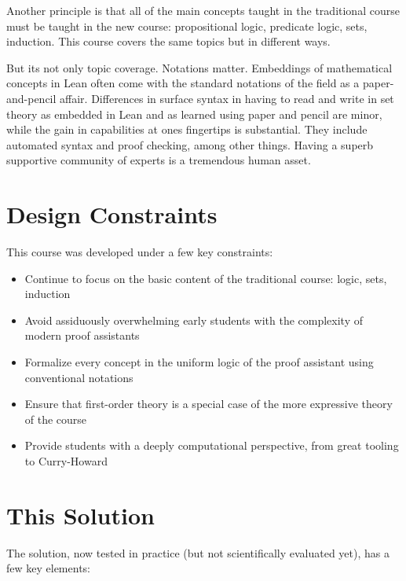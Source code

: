 \documentclass{book}
\providecommand{\tightlist}{%
  \setlength{\itemsep}{0pt}\setlength{\parskip}{0pt}}
\begin{document}
Another principle is that all of the main concepts taught in the traditional course must
be taught in the new course: propositional logic, predicate logic, sets, induction. This
course covers the same topics but in different ways.

But it\textquotesingle s not only topic coverage. Notations matter. Embeddings of mathematical concepts
in Lean often come with the standard notations of the field as a paper-and-pencil affair.
Differences in surface syntax in having to read and write in set theory as embedded in
Lean and as learned using paper and pencil are minor, while the gain in capabilities at
one\textquotesingle s fingertips is substantial. They include automated syntax and proof checking, among
other things. Having a superb supportive community of experts is a tremendous human asset.

\hypertarget{book__pandoc__debug__src__preface.md__design-constraints}{%
\section*{Design Constraints}\label{book__pandoc__debug__src__preface.md__design-constraints}}

This course was developed under a few key constraints:

\begin{itemize}
\tightlist
\item
  Continue to focus on the basic content of the traditional course: logic, sets, induction
\item
  Avoid assiduously overwhelming early students with the complexity of modern proof assistants
\item
  Formalize every concept in the uniform logic of the proof assistant using conventional notations
\item
  Ensure that first-order theory is a special case of the more expressive theory of the course
\item
  Provide students with a deeply computational perspective, from great tooling to Curry-Howard
\end{itemize}

\hypertarget{book__pandoc__debug__src__preface.md__this-solution}{%
\section*{This Solution}\label{book__pandoc__debug__src__preface.md__this-solution}}

The solution, now tested in practice (but not scientifically evaluated yet), has a few
key elements:
\end{document}
